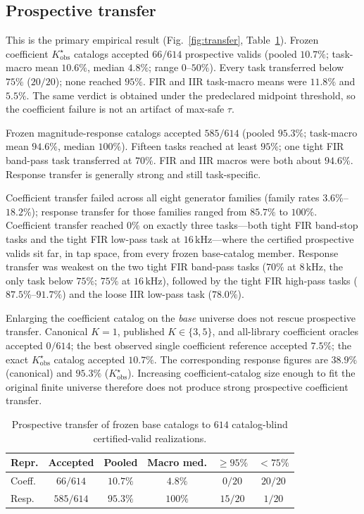 \documentclass{article}
\begin{document}
\subsection{Prospective transfer}
This is the primary empirical result (Fig.~\ref{fig:transfer},
Table~\ref{tab:xfer}).
Frozen coefficient $K^\star_{\mathrm{obs}}$ catalogs accepted
$66/614$ prospective valids (pooled $10.7\%$; task-macro mean
$10.6\%$, median $4.8\%$; range $0$--$50\%$).
Every task transferred below $75\%$ ($20/20$); none reached
$95\%$.
FIR and IIR task-macro means were $11.8\%$ and $5.5\%$.
The same verdict is obtained under the predeclared midpoint
threshold, so the coefficient failure is not an artifact of
max-safe $\tau$.

Frozen magnitude-response catalogs accepted $585/614$ (pooled
$95.3\%$; task-macro mean $94.6\%$, median $100\%$).
Fifteen tasks reached at least $95\%$; one tight FIR band-pass
task transferred at $70\%$.
FIR and IIR macros were both about $94.6\%$.
Response transfer is generally strong and still task-specific.

Coefficient transfer failed across all eight generator families
(family rates $3.6\%$--$18.2\%$); response transfer for those
families ranged from $85.7\%$ to $100\%$.
Coefficient transfer reached $0\%$ on exactly three tasks---both
tight FIR band-stop tasks and the tight FIR low-pass task at
$16\,\mathrm{kHz}$---where the certified prospective valids sit far,
in tap space, from every frozen base-catalog member.
Response transfer was weakest on the two tight FIR band-pass tasks
($70\%$ at $8\,\mathrm{kHz}$, the only task below $75\%$; $75\%$ at
$16\,\mathrm{kHz}$), followed by the tight FIR high-pass tasks
($87.5\%$--$91.7\%$) and the loose IIR low-pass task ($78.0\%$).

Enlarging the coefficient catalog on the \emph{base} universe does
not rescue prospective transfer.
Canonical $K{=}1$, published $K{\in}\{3,5\}$, and all-library
coefficient oracles accepted $0/614$; the best observed single
coefficient reference accepted $7.5\%$; the exact
$K^\star_{\mathrm{obs}}$ catalog accepted $10.7\%$.
The corresponding response figures are $38.9\%$ (canonical) and
$95.3\%$ ($K^\star_{\mathrm{obs}}$).
Increasing coefficient-catalog size enough to fit the original
finite universe therefore does not produce strong prospective
coefficient transfer.

\begin{table}[t]
\caption{Prospective transfer of frozen base catalogs to $614$
catalog-blind certified-valid realizations.}
\label{tab:xfer}
\centering
\setlength{\tabcolsep}{3.6pt}
\begin{tabular}{lccccc}
\toprule
Repr. & Accepted & Pooled & Macro med. & ${\ge}95\%$ & ${<}75\%$ \\
\midrule
Coeff. & $66/614$ & $10.7\%$ & $4.8\%$ & $0/20$ & $20/20$ \\
Resp.  & $585/614$ & $95.3\%$ & $100\%$ & $15/20$ & $1/20$ \\
\bottomrule
\end{tabular}
\end{table}
\end{document}
